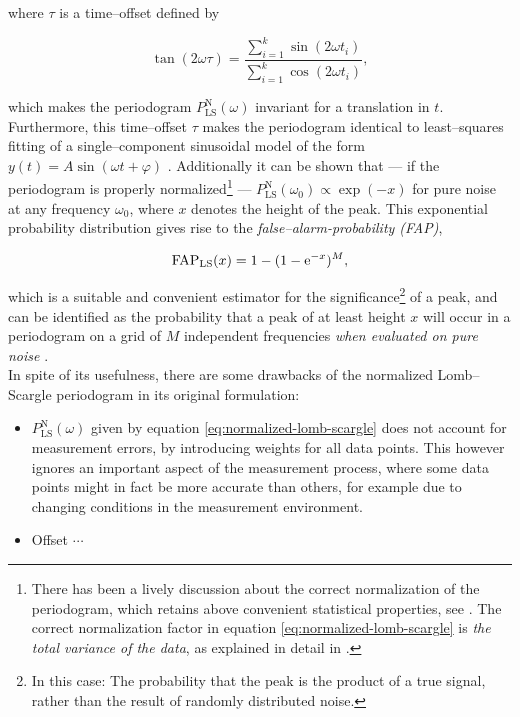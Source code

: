 where $\tau$ is a time--offset defined by

\begin{equation}
\tan(2 \omega \tau) = \frac{\sum\limits_{i=1}^k \sin(2 \omega t_i)}{\sum\limits_{i=1}^k \cos(2 \omega t_i)},
\end{equation}

which makes the periodogram $P^{\text{N}}_{\text{LS}}(\omega)$ invariant for a translation in $t$. Furthermore, this time--offset $\tau$ makes the periodogram identical to least--squares fitting of a single--component sinusoidal model of the form $y(t) = A \sin(\omega t + \varphi)$ \citep{horne1986, vanderplas2015}. Additionally it can be shown that --- if the periodogram is properly normalized\footnote{There has been a lively discussion about the correct normalization of the periodogram, which retains above convenient statistical properties, see \citet{lomb1976,astroML,zechmeister2009}. The correct normalization factor in equation \eqref{eq:normalized-lomb-scargle} is \emph{the total variance of the data}, as explained in detail in \citet{horne1986}.} --- $P^{\text{N}}_{\text{LS}}(\omega_0) \propto \exp(-x)$ for pure noise at any frequency $\omega_0$, where $x$ denotes the height of the peak. This exponential probability distribution gives rise to the \emph{false--alarm-probability (FAP)},

\begin{equation}
\text{FAP}_{\text{LS}}(x) = 1 - (1 - \mathrm{e}^{-x})^M,
\end{equation}

which is a suitable and convenient estimator for the significance\footnote{In this case: The probability that the peak is the product of a true signal, rather than the result of randomly distributed noise.} of a peak, and can be identified as the probability that a peak of at least height $x$ will occur in a periodogram on a grid of $M$ independent frequencies \emph{when evaluated on pure noise} \citep{horne1986}.\\

In spite of its usefulness, there are some drawbacks of the normalized Lomb--Scargle periodogram in its original formulation:

\begin{itemize}
\item $P^{\text{N}}_{\text{LS}}(\omega)$ given by equation \eqref{eq:normalized-lomb-scargle} does not account for measurement errors, \eg by introducing weights for all data points. This however ignores an important aspect of the measurement process, where some data points might in fact be more accurate than others, for example due to changing conditions in the measurement environment.
\item Offset $\cdots$ %
\end{itemize}

